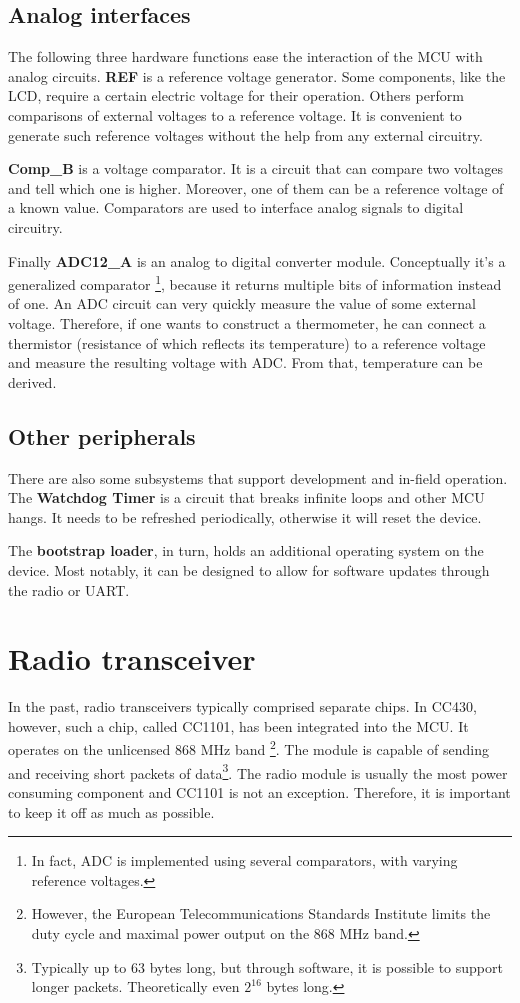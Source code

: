 \subsection{Analog interfaces}

The following three hardware functions ease the interaction
of the MCU with analog circuits.  {\bf REF} is a reference voltage
generator. Some components, like the LCD, require a certain electric
voltage for their operation.  Others perform comparisons of external
voltages to a reference voltage. It is convenient to generate such
reference voltages without the help from any external circuitry.

{\bf Comp\_B} is a voltage comparator. It is a circuit that can
compare two voltages and tell which one is higher. Moreover, one of
them can be a reference voltage of a known value. Comparators are used
to interface analog signals to digital circuitry.

Finally {\bf ADC12\_A} is an analog to digital converter
module. Conceptually it's a generalized comparator \footnote{In
fact, ADC is implemented using several comparators, with varying
reference voltages.}, because it returns multiple bits of information
instead of one.  An ADC circuit can very quickly measure the value of
some external voltage. Therefore, if one wants to construct a thermometer,
he can connect a thermistor (resistance of which reflects its
temperature) to a reference voltage and measure the resulting
voltage with ADC. From that, temperature can be derived.

\subsection{Other peripherals}

There are also some subsystems that support development and in-field
operation. The {\bf Watchdog Timer} is a circuit that breaks infinite
loops and other MCU hangs. It needs to be refreshed periodically,
otherwise it will reset the device.

The {\bf bootstrap loader}, in turn, holds an additional operating
system on the device.  Most notably, it can be designed to allow for
software updates through the radio or UART.

\section{Radio transceiver}

In the past, radio transceivers typically comprised separate chips. In
CC430, however, such a chip, called CC1101, has been integrated into
the MCU.  It operates on the unlicensed 868 MHz band
\footnote{However, the European Telecommunications Standards Institute
limits the duty cycle and maximal power output on the 868 MHz band.}.
The module is capable of sending and receiving short packets of
data\footnote{Typically up to 63 bytes long, but through software, it
is possible to support longer packets. Theoretically even $2^{16}$
bytes long.}.  The radio module is usually the most power consuming
component and CC1101 is not an exception. Therefore, it is important
to keep it off as much as possible.


